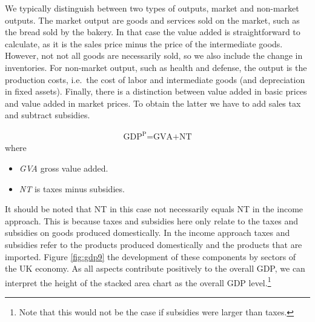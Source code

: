 \documentclass[]{book}
\providecommand{\tightlist}{%
  \setlength{\itemsep}{0pt}\setlength{\parskip}{0pt}}
\let\rmarkdownfootnote\footnote%
\def\footnote{\protect\rmarkdownfootnote}
\begin{document}
We typically distinguish between two types of outputs, market and non-market outputs. The market output are goods and services sold on the market, such as the bread sold by the bakery. In that case the value added is straightforward to calculate, as it is the sales price minus the price of the intermediate goods. However, not not all goods are necessarily sold, so we also include the change in inventories. For non-market output, such as health and defense, the output is the production costs, i.e.~the cost of labor and intermediate goods (and depreciation in fixed assets). Finally, there is a distinction between value added in basic prices and value added in market prices. To obtain the latter we have to add sales tax and subtract subsidies.

\begin{align}
   \text{GDP}^{\text{P}} \text{=GVA+NT}
\end{align}
where

\begin{itemize}
\tightlist
\item
  \emph{GVA} gross value added.
\item
  \emph{NT} is taxes minus subsidies.
\end{itemize}

It should be noted that NT in this case not necessarily equals NT in the income approach. This is because taxes and subsidies here only relate to the taxes and subsidies on goods produced domestically. In the income approach taxes and subsidies refer to the products produced domestically and the products that are imported. Figure \ref{fig:gdp9} the development of these components by sectors of the UK economy. As all aspects contribute positively to the overall GDP, we can interpret the height of the stacked area chart as the overall GDP level.\footnote{Note that this would not be the case if subsidies were larger than taxes.}
\end{document}
